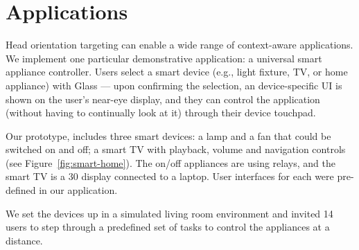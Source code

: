 \section{Applications}
\label{sec:applications}

Head orientation targeting can enable a wide range of context-aware applications. We implement one particular demonstrative application: a universal smart appliance controller. Users select a smart device (e.g., light fixture, TV, or home appliance) with Glass --- upon confirming the selection, an device-specific UI is shown on the user's near-eye display, and they can control the application (without having to continually look at it) through their device touchpad.

Our prototype,  includes three smart devices: a lamp and a fan that could be switched on and off; a smart TV with playback, volume and navigation controls (see Figure~\ref{fig:smart-home}). The on/off appliances are using relays, and the smart TV is a 30\inch{} display connected to a laptop. User interfaces for each were pre-defined in our application.

%
We set the devices up in a simulated living room environment and invited 14 users to step through a predefined set of tasks to control the appliances at a distance. 



